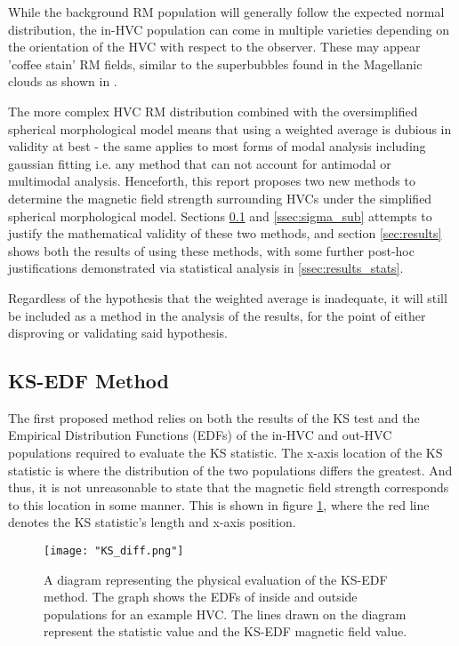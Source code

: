 While the background RM population will generally follow the expected normal distribution, the in-HVC population can come in multiple varieties depending on the orientation of the HVC with respect to the observer. These may appear 'coffee stain' RM fields, similar to the superbubbles found in the Magellanic clouds as shown in \cite{ID75}.


The more complex HVC RM distribution combined with the oversimplified spherical morphological model means that using a weighted average is dubious in validity at best - the same applies to most forms of modal analysis including gaussian fitting i.e. any method that can not account for antimodal or multimodal analysis. Henceforth, this report proposes two new methods to determine the magnetic field strength surrounding HVCs under the simplified spherical morphological model. Sections \ref{ssec:KS_EDF} and \ref{ssec:sigma_sub} attempts to justify the mathematical validity of these two methods, and section \ref{sec:results} shows both the results of using these methods, with some further post-hoc justifications demonstrated via statistical analysis in \ref{ssec:results_stats}.


Regardless of the hypothesis that the weighted average is inadequate, it will still be included as a method in the analysis of the results, for the point of either disproving or validating said hypothesis.


\subsection{KS-EDF Method}
\label{ssec:KS_EDF}

The first proposed method relies on both the results of the KS test and the Empirical Distribution Functions (EDFs) of the in-HVC and out-HVC populations required to evaluate the KS statistic. The x-axis location of the KS statistic is where the distribution of the two populations differs the greatest. And thus, it is not unreasonable to state that the magnetic field strength corresponds to this location in some manner. This is shown in figure \ref{fig:KSdiff}, where the red line denotes the KS statistic's length and x-axis position.


\begin{figure}
    \texttt{[image: "KS\_diff.png"]}
    \centering
    \caption{A diagram representing the physical evaluation of the KS-EDF method. The graph shows the EDFs of inside and outside populations for an example HVC. The lines drawn on the diagram represent the statistic value and the KS-EDF magnetic field value.}
    \label{fig:KSdiff}
\end{figure}

